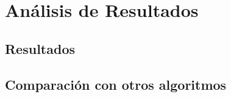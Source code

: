 \chapter{Análisis de Resultados}

    \section{Resultados}
    


    \section{Comparación con otros algoritmos}
    
